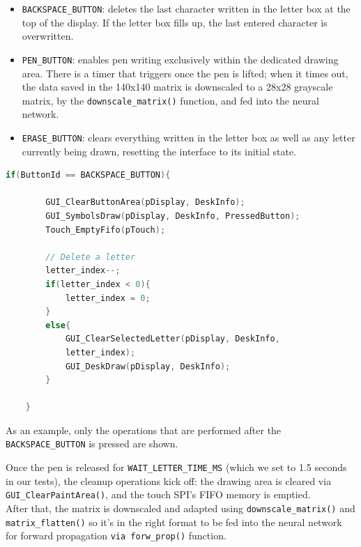 \begin{itemize}

    \setlength\itemsep{0pt}
    \setlength\parskip{0pt}
    
    \item \texttt{BACKSPACE\_BUTTON}: deletes the last character written in the letter box at the top of the display. If the letter box fills up, the last entered character is overwritten.
    
    \item \texttt{PEN\_BUTTON}: enables pen writing exclusively within the dedicated drawing area. There is a timer that triggers once the pen is lifted; when it times out, the data saved in the 140x140 matrix is downscaled to a 28x28 grayscale matrix, by the \texttt{downscale\_matrix()} function, and fed into the neural network.

    \item \texttt{ERASE\_BUTTON}: clears everything written in the letter box as well as any letter currently being drawn, resetting the interface to its initial state.
\end{itemize}

\vspace{1em}
\begin{lstlisting}[language=C, caption={Handling the buttons}, label={lst:Touch_screen_buttons}]
    if(ButtonId == BACKSPACE_BUTTON){
    
        GUI_ClearButtonArea(pDisplay, DeskInfo);
        GUI_SymbolsDraw(pDisplay, DeskInfo, PressedButton);
        Touch_EmptyFifo(pTouch);
    
        // Delete a letter
        letter_index--;
        if(letter_index < 0){
            letter_index = 0;
        }
        else{
            GUI_ClearSelectedLetter(pDisplay, DeskInfo,
            letter_index);
            GUI_DeskDraw(pDisplay, DeskInfo);
        }
    
    }
\end{lstlisting}

\noindent
As an example, only the operations that are performed after the \\\texttt{BACKSPACE\_BUTTON} is pressed are shown.

\noindent
Once the pen is released for \texttt{WAIT\_LETTER\_TIME\_MS} (which we set to 1.5 seconds in our tests), the cleanup operations kick off: the drawing area is cleared via \texttt{GUI\_ClearPaintArea()}, and the touch SPI's FIFO memory is emptied. \\
After that, the matrix is downscaled and adapted using \texttt{downscale\_matrix()} and \texttt{matrix\_flatten()} so it's in the right format to be fed into the neural network for forward propagation \texttt{via forw\_prop()} function.

